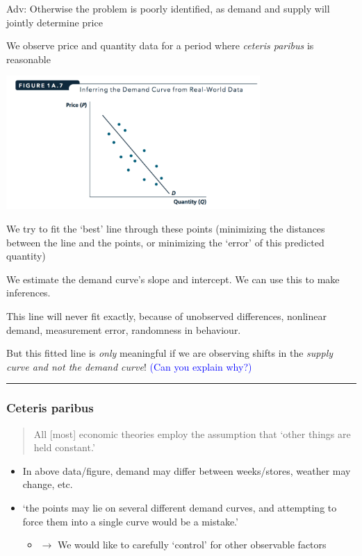 \documentclass[]{article}
\providecommand{\tightlist}{%
  \setlength{\itemsep}{0pt}\setlength{\parskip}{0pt}}
\begin{document}
\textcolor{RawSienna}{Adv: Otherwise the problem is poorly identified, as demand and supply will jointly determine price}

We observe price and quantity data for a period where \emph{ceteris paribus} is reasonable

\includegraphics[height=2in]{picsfigs/demanddata.png}

We try to fit the `best' line through these points (minimizing the distances between the line and the points, or minimizing the `error' of this predicted quantity)

We estimate the demand curve's slope and intercept.
We can use this to make inferences.

This line will never fit exactly, because of unobserved differences, nonlinear demand, measurement error, randomness in behaviour.

But this fitted line is \emph{only} meaningful if we are observing shifts in the \emph{supply curve and not the demand curve}! \textcolor{blue}{(Can you explain why?)}

\begin{center}\rule{0.5\linewidth}{\linethickness}\end{center}

\hypertarget{ceteris-paribus}{%
\subsubsection{Ceteris paribus}\label{ceteris-paribus}}

\begin{quote}
All {[}most{]} economic theories employ the assumption that `other things are held constant.'
\end{quote}

\begin{itemize}
\tightlist
\item
  In above data/figure, demand may differ between weeks/stores, weather may change, etc.
\item
  `the points may lie on several different demand curves, and attempting to force them into a single curve would be a mistake.'

  \begin{itemize}
  \tightlist
  \item
    \(\rightarrow\) We would like to carefully `control' for other observable factors
  \end{itemize}
\end{itemize}
\end{document}
